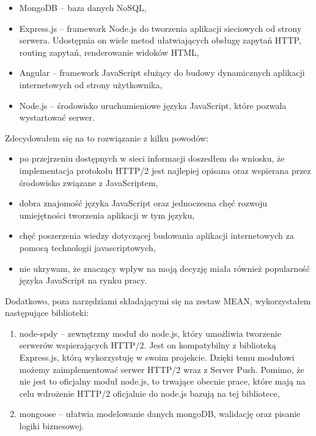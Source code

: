 \documentclass[a4paper,12pt,twoside,openany]{report}
\begin{document}
\begin{itemize}
	\item MongoDB -- baza danych NoSQL,
	\item Express.js -- framework Node.js do tworzenia aplikacji sieciowych od strony serwera.
	Udostępnia on wiele metod ułatwiających obsługę zapytań HTTP, routing zapytań, renderowanie widoków HTML,
	\item Angular -- framework JavaScript służący do budowy dynamicznych aplikacji internetowych od strony użytkownika,
	\item Node.js -- środowisko uruchumieniowe języka JavaScript, które pozwala wystartować serwer.
\end{itemize}

Zdecydowałem się na to rozwiązanie z kilku powodów:

\begin{itemize}
	\item po przejrzeniu dostępnych w sieci informacji doszedłem do wniosku, że implementacja protokołu HTTP/2 jest najlepiej opisana oraz wspierana przez środowisko związane z JavaScriptem,
	\item dobra znajomość języka JavaScript oraz jednoczesna chęć rozwoju umiejętności tworzenia aplikacji w tym języku,
	\item chęć poszerzenia wiedzy dotyczącej budowania aplikacji internetowych za pomocą technologii javascriptowych,
	\item nie ukrywam, że znaczący wpływ na moją decyzję miała również popularność języka JavaScript na rynku pracy.
\end{itemize}

Dodatkowo, poza narzędziami składającymi się na zestaw MEAN, wykorzystałem następujące biblioteki:
\begin{enumerate}
	\item node-spdy -- zewnętrzny moduł do node.js, który umożliwia tworzenie serwerów wspierających HTTP/2.
	Jest on kompatybilny z biblioteką Express.js, którą wykorzystuję w swoim projekcie.
	Dzięki temu modułowi możemy zaimplementować serwer HTTP/2 wraz z Server Push.
	Pomimo, że nie jest to oficjalny moduł node.js, to trwające obecnie prace, które mają na celu wdrożenie HTTP/2 oficjalnie do node.js bazują na tej bibliotece,
	\item mongoose -- ułatwia modelowanie danych mongoDB, walidację oraz pisanie logiki biznesowej. 
\end{enumerate}

\end{document}
